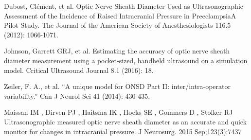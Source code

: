 \documentclass{llncs}
\begin{document}
%
%
\begin{thebibliography}{}
%
Dubost, Clément, et al. 
Optic Nerve Sheath Diameter Used as Ultrasonographic Assessment of the Incidence of Raised Intracranial Pressure in PreeclampsiaA Pilot Study.
The Journal of the American Society of Anesthesiologists 116.5 (2012): 1066-1071.

Johnson, Garrett GRJ, et al. 
Estimating the accuracy of optic nerve sheath diameter measurement using a pocket-sized, handheld ultrasound on a simulation model.
Critical Ultrasound Journal 8.1 (2016): 18.

Zeiler, F. A., et al. 
“A unique model for ONSD Part II: inter/intra-operator variability.” 
Can J Neurol Sci 41 (2014): 430-435.

Maissan IM , Dirven PJ , Haitsma IK , Hoeks SE , Gommers D , Stolker RJ 
Ultrasonographic measured optic nerve sheath diameter as an accurate and quick monitor for changes in intracranial pressure. 
J Neurosurg. 2015 Sep;123(3):7437
\end{thebibliography}
\end{document}
